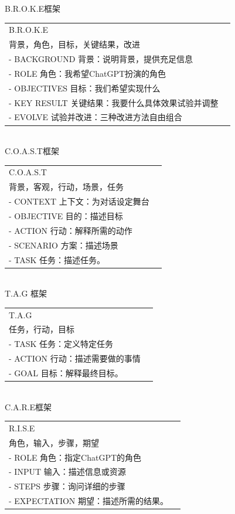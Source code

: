 \documentclass[12pt]{book}
\begin{document}
	
B.R.O.K.E框架\\
\begin{tabular}{|p{16cm}|p{3cm}|}
	\hline
		B.R.O.K.E\\
		背景，角色，目标，关键结果，改进\\
		- BACKGROUND 背景：说明背景，提供充足信息\\
		- ROLE 角色：我希望ChatGPT扮演的角色\\
		- OBJECTIVES 目标：我们希望实现什么\\
		- KEY RESULT 关键结果：我要什么具体效果试验并调整\\
		- EVOLVE 试验并改进：三种改进方法自由组合\\
		\hline
\end{tabular}\\

	
	
C.O.A.S.T框架\\
\begin{tabular}{|p{16cm}|p{3cm}|}
	\hline
		C.O.A.S.T\\
		背景，客观，行动，场景，任务\\
		- CONTEXT 上下文：为对话设定舞台\\
		- OBJECTIVE 目的：描述目标\\
		- ACTION 行动：解释所需的动作\\
		- SCENARIO 方案：描述场景\\
		- TASK 任务：描述任务。\\
		\hline
\end{tabular}\\

	
	
T.A.G 框架\\
\begin{tabular}{|p{16cm}|p{3cm}|}
	\hline
		T.A.G\\
		任务，行动，目标\\
		- TASK 任务：定义特定任务\\
		- ACTION 行动：描述需要做的事情\\
		- GOAL 目标：解释最终目标。\\
		\hline
\end{tabular}\\
	
	
C.A.R.E框架\\
\begin{tabular}{|p{16cm}|p{3cm}|}
	\hline
		R.I.S.E\\
		角色，输入，步骤，期望\\
		- ROLE 角色：指定ChatGPT的角色\\
		- INPUT 输入：描述信息或资源\\
		- STEPS 步骤：询问详细的步骤\\
		- EXPECTATION 期望：描述所需的结果。\\
		\hline
\end{tabular}\\
	
\end{document}
